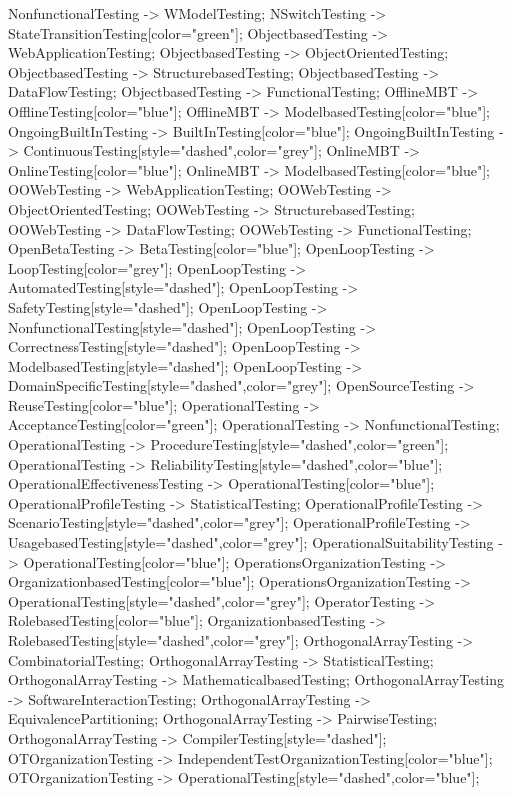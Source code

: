 \documentclass{article}
\begin{document}
{NonfunctionalTesting -> WModelTesting;
NSwitchTesting -> StateTransitionTesting[color="green"];
ObjectbasedTesting -> WebApplicationTesting;
ObjectbasedTesting -> ObjectOrientedTesting;
ObjectbasedTesting -> StructurebasedTesting;
ObjectbasedTesting -> DataFlowTesting;
ObjectbasedTesting -> FunctionalTesting;
OfflineMBT -> OfflineTesting[color="blue"];
OfflineMBT -> ModelbasedTesting[color="blue"];
OngoingBuiltInTesting -> BuiltInTesting[color="blue"];
OngoingBuiltInTesting -> ContinuousTesting[style="dashed",color="grey"];
OnlineMBT -> OnlineTesting[color="blue"];
OnlineMBT -> ModelbasedTesting[color="blue"];
OOWebTesting -> WebApplicationTesting;
OOWebTesting -> ObjectOrientedTesting;
OOWebTesting -> StructurebasedTesting;
OOWebTesting -> DataFlowTesting;
OOWebTesting -> FunctionalTesting;
OpenBetaTesting -> BetaTesting[color="blue"];
OpenLoopTesting -> LoopTesting[color="grey"];
OpenLoopTesting -> AutomatedTesting[style="dashed"];
OpenLoopTesting -> SafetyTesting[style="dashed"];
OpenLoopTesting -> NonfunctionalTesting[style="dashed"];
OpenLoopTesting -> CorrectnessTesting[style="dashed"];
OpenLoopTesting -> ModelbasedTesting[style="dashed"];
OpenLoopTesting -> DomainSpecificTesting[style="dashed",color="grey"];
OpenSourceTesting -> ReuseTesting[color="blue"];
OperationalTesting -> AcceptanceTesting[color="green"];
OperationalTesting -> NonfunctionalTesting;
OperationalTesting -> ProcedureTesting[style="dashed",color="green"];
OperationalTesting -> ReliabilityTesting[style="dashed",color="blue"];
OperationalEffectivenessTesting -> OperationalTesting[color="blue"];
OperationalProfileTesting -> StatisticalTesting;
OperationalProfileTesting -> ScenarioTesting[style="dashed",color="grey"];
OperationalProfileTesting -> UsagebasedTesting[style="dashed",color="grey"];
OperationalSuitabilityTesting -> OperationalTesting[color="blue"];
OperationsOrganizationTesting -> OrganizationbasedTesting[color="blue"];
OperationsOrganizationTesting -> OperationalTesting[style="dashed",color="grey"];
OperatorTesting -> RolebasedTesting[color="blue"];
OrganizationbasedTesting -> RolebasedTesting[style="dashed",color="grey"];
OrthogonalArrayTesting -> CombinatorialTesting;
OrthogonalArrayTesting -> StatisticalTesting;
OrthogonalArrayTesting -> MathematicalbasedTesting;
OrthogonalArrayTesting -> SoftwareInteractionTesting;
OrthogonalArrayTesting -> EquivalencePartitioning;
OrthogonalArrayTesting -> PairwiseTesting;
OrthogonalArrayTesting -> CompilerTesting[style="dashed"];
OTOrganizationTesting -> IndependentTestOrganizationTesting[color="blue"];
OTOrganizationTesting -> OperationalTesting[style="dashed",color="blue"];
}
\end{document}
